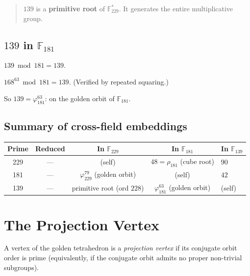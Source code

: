 \begin{quote}
$139$ is a \textbf{primitive root} of $\mathbb{F}_{229}^*$.
It generates the entire multiplicative group.
\end{quote}

\subsection{$139$ in $\mathbb{F}_{181}$}

$139 \bmod 181 = 139$.

$168^{63} \bmod 181 = 139$. (Verified by repeated squaring.)

So $139 = \varphi_{181}^{63}$: on the golden orbit of $\mathbb{F}_{181}$.

\subsection{Summary of cross-field embeddings}

\begin{center}
\begin{tabular}{@{}ccccl@{}}
\toprule
Prime & Reduced & In $\mathbb{F}_{229}$ & In $\mathbb{F}_{181}$ & In $\mathbb{F}_{139}$ \\
\midrule
229 & --- & (self) & $48 = \rho_{181}$ (cube root) & $90$ \\
181 & --- & $\varphi_{229}^{79}$ (golden orbit) & (self) & $42$ \\
139 & --- & primitive root (ord $228$) & $\varphi_{181}^{63}$ (golden orbit) & (self) \\
\bottomrule
\end{tabular}
\end{center}

\section{The Projection Vertex}
\label{sec:projection}

\begin{definition}
A vertex of the golden tetrahedron is a \emph{projection vertex}
if its conjugate orbit order is prime (equivalently, if the
conjugate orbit admits no proper non-trivial subgroups).
\end{definition}


